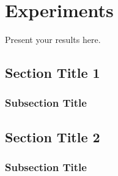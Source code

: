 \chapter{Experiments}\label{chap:experiments}
Present your results here. 
\section{Section Title 1}
\subsection{Subsection Title}
\section{Section Title 2}
\subsection{Subsection Title}



